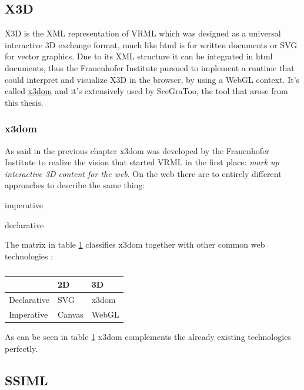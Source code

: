 \subsection{X3D}
\label{x3d}

X3D is the XML representation of VRML which was designed as
a universal interactive 3D exchange format, much like html is for
written documents or \gls{SVG} for vector graphics. Due to its XML structure
it can be integrated in html documents, thus the Frauenhofer Institute
pursued to implement a runtime that could interpret and visualize X3D in
the browser, by using a WebGL context. It's called
\href{http://www.x3dom.org/}{x3dom} and it's extensively used by
SceGraToo, the tool that arose from this thesis.

\subsubsection{x3dom}
\label{par:x3dom}

As said in the previous chapter x3dom was developed by the Frauenhofer
Institute to realize the vision that started VRML in the first place:
\emph{mark up interactive 3D content for the web}. On the web there are
to entirely different approaches to describe the same thing:
\begin{itemize*}
  \item imperative
  \item declarative
\end{itemize*}

The matrix in table \ref{tab:feature_matrix} classifies x3dom together with other common web
technologies \cite{x3dom}:

\begin{table}[H]
  \begin{longtable}[c]{@{}lll@{}}
  \toprule
  & 2D & 3D\tabularnewline
  \midrule
  \endhead
  Declarative & \gls{SVG} \cite{svg} & x3dom \cite{x3dom} \tabularnewline
  Imperative  & Canvas \cite{canvas} & WebGL \cite{webgl} \tabularnewline
  \bottomrule
  \end{longtable}
  \caption{\cite{x3dom}}
  \label{tab:feature_matrix}
\end{table}

As can be seen in table \ref{tab:feature_matrix} x3dom complements the already existing technologies
perfectly.

\subsection{SSIML}
\label{ssiml}

